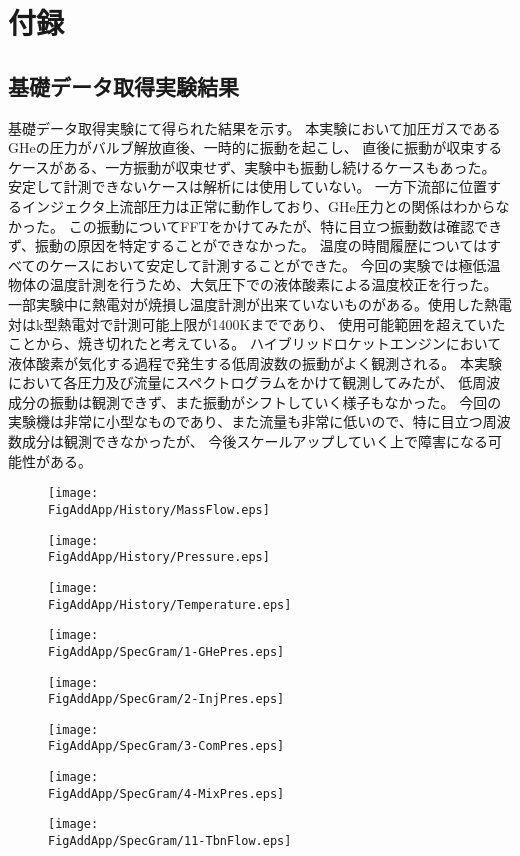 \chapter*{付録}
\section{基礎データ取得実験結果}
基礎データ取得実験にて得られた結果を示す。
本実験において加圧ガスであるGHeの圧力がバルブ解放直後、一時的に振動を起こし、
直後に振動が収束するケースがある、一方振動が収束せず、実験中も振動し続けるケースもあった。
安定して計測できないケースは解析には使用していない。
一方下流部に位置するインジェクタ上流部圧力は正常に動作しており、GHe圧力との関係はわからなかった。
この振動についてFFTをかけてみたが、特に目立つ振動数は確認できず、振動の原因を特定することができなかった。
温度の時間履歴についてはすべてのケースにおいて安定して計測することができた。
今回の実験では極低温物体の温度計測を行うため、大気圧下での液体酸素による温度校正を行った。
一部実験中に熱電対が焼損し温度計測が出来ていないものがある。使用した熱電対はk型熱電対で計測可能上限が1400Kまでであり、
使用可能範囲を超えていたことから、焼き切れたと考えている。
ハイブリッドロケットエンジンにおいて液体酸素が気化する過程で発生する低周波数の振動がよく観測される。
本実験において各圧力及び流量にスペクトログラムをかけて観測してみたが、
低周波成分の振動は観測できず、また振動がシフトしていく様子もなかった。
今回の実験機は非常に小型なものであり、また流量も非常に低いので、特に目立つ周波数成分は観測できなかったが、
今後スケールアップしていく上で障害になる可能性がある。
\newcommand{\FigAddApp}{./src/Appendix/Figure}
\begin{figure}
\centering
\texttt{[image: \\FigAddApp/History/MassFlow.eps]}
\caption{}
\end{figure}
\begin{figure}
\centering
\texttt{[image: \\FigAddApp/History/Pressure.eps]}
\caption{}
\end{figure}
\begin{figure}
\centering
\texttt{[image: \\FigAddApp/History/Temperature.eps]}
\caption{}
\end{figure}
\begin{figure}
\centering
\texttt{[image: \\FigAddApp/SpecGram/1-GHePres.eps]}
\caption{}
\end{figure}
\begin{figure}
\centering
\texttt{[image: \\FigAddApp/SpecGram/2-InjPres.eps]}
\caption{}
\end{figure}
\begin{figure}
\centering
\texttt{[image: \\FigAddApp/SpecGram/3-ComPres.eps]}
\caption{}
\end{figure}
\begin{figure}
\centering
\texttt{[image: \\FigAddApp/SpecGram/4-MixPres.eps]}
\caption{}
\end{figure}
\begin{figure}
\centering
\texttt{[image: \\FigAddApp/SpecGram/11-TbnFlow.eps]}
\caption{}
\end{figure}
